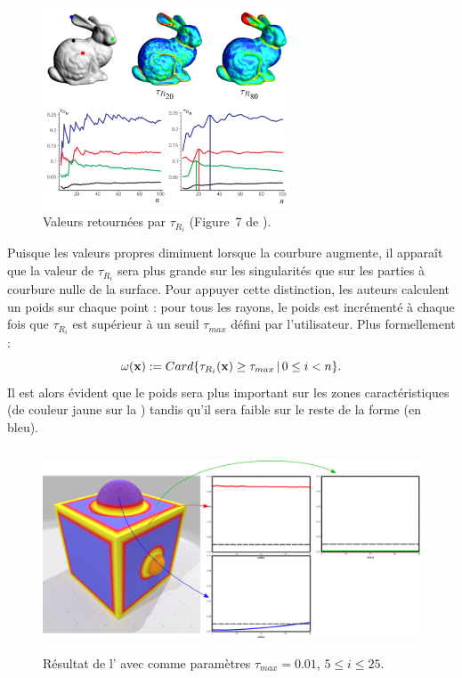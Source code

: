 \begin{figure}[ht]{
  \begin{center}
    \includegraphics[height=6cm]{images/Feature/PaulyTau}
  \end{center}}
    \caption[Valeurs retournées par $\tau_{R_i}$.]{Valeurs retournées par $\tau_{R_i}$ (Figure~7 de \cite{Pauly2003}).
    \label{fig:pauly-tau}}
\end{figure}

Puisque les valeurs propres diminuent lorsque la courbure augmente, il apparaît
que la valeur de $\tau_{R_i}$ sera plus grande sur les singularités que sur les parties
à courbure nulle de la surface. Pour appuyer cette distinction, les auteurs calculent un
poids sur chaque point : pour tous les rayons, le poids est incrémenté à chaque
fois que $\tau_{R_i}$ est supérieur à un seuil $\tau_{max}$ défini par
l'utilisateur. Plus formellement :
%
\begin{equation}
  \label{eq:pauly-omega}
  \omega(\mathbf{x}) := Card \{ \tau_{R_i}(\mathbf{x}) \geq \tau_{max}\,|\,0\leq i < n \}.
\end{equation}
%
Il est alors évident que le poids sera plus important sur les zones
caractéristiques (de couleur jaune sur la )
tandis qu'il sera faible sur le reste de la forme (en bleu).

\begin{figure}[ht]{
  \begin{center}
    \includegraphics[height=6cm]{figures/CubeSpherePlotPauly}
  \end{center}}
    \caption[Résultat de l']{Résultat de l' avec comme paramètres $\tau_{max} = 0.01$, $5 \le i \le 25$.
    \label{fig:pauly-cubesphere}}
\end{figure}

